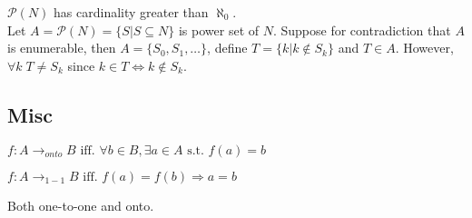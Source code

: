  $\mathscr{P}(N)$ has cardinality greater than $\aleph_0$.\\
Let $A=\mathscr{P}(N) = \{S|S \subseteq N\}$ is power set of $N$. Suppose for
contradiction that $A$ is enumerable, then $A=\{S_0,S_1,\ldots\}$, define
$T=\{k|k\notin S_k\}$ and $T \in A$. However, $\forall k\; T \neq S_k$ since $k
\in T \Leftrightarrow k \notin S_k$.

\subsection{Misc}

 $f: A \rightarrow_{onto} B \text{ iff. } \forall b \in B, \exists a
\in A \text{ s.t. } f(a) = b$

  $f: A \rightarrow_{1-1} B \text{ iff. } f(a)=f(b)
\Rightarrow a=b$

 Both one-to-one and onto.


